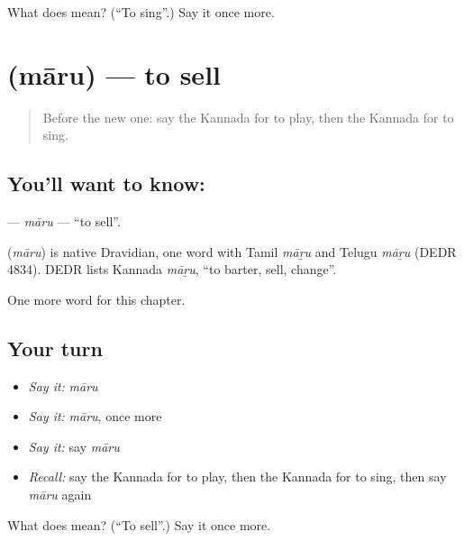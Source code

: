 \begin{tcolorbox}[breakable,colback=teal!4,colframe=teal!35!black,title={Before you move on}]
What does  mean? (\textquotedblleft{}To sing\textquotedblright{}.) Say it once more.
\end{tcolorbox}
\section[\texorpdfstring{\kn{ಮಾರು} (māru)}{ಮಾರು (māru)}]{ (māru) — to sell}

\label{lesson:KA-C152-maru}



\begin{quote}
Before the new one: say the Kannada for to play, then the Kannada for to sing.
\end{quote}

\subsection*{You'll want to know: }
\textbf{} — \emph{māru} — \textquotedblleft{}to sell\textquotedblright{}.

\begin{cousinweb}
\textbf{} (\emph{māru}) is native Dravidian, one word with Tamil \emph{māṟu} and Telugu \emph{māṟu} (DEDR 4834). DEDR lists Kannada \emph{māṟu}, \textquotedblleft{}to barter, sell, change\textquotedblright{}.
\end{cousinweb}

\begin{grammarlens}[title={What you've built}]
One more word for this chapter.
\end{grammarlens}

\subsection*{Your turn}
\begin{itemize}
\raggedright
  \item \emph{Say it:} \emph{māru}
  \item \emph{Say it:} \emph{māru}, once more
  \item \emph{Say it:} say \emph{māru}
  \item \emph{Recall:} say the Kannada for to play, then the Kannada for to sing, then say \emph{māru} again
\end{itemize}

\begin{tcolorbox}[breakable,colback=teal!4,colframe=teal!35!black,title={Before you move on}]
What does  mean? (\textquotedblleft{}To sell\textquotedblright{}.) Say it once more.
\end{tcolorbox}
